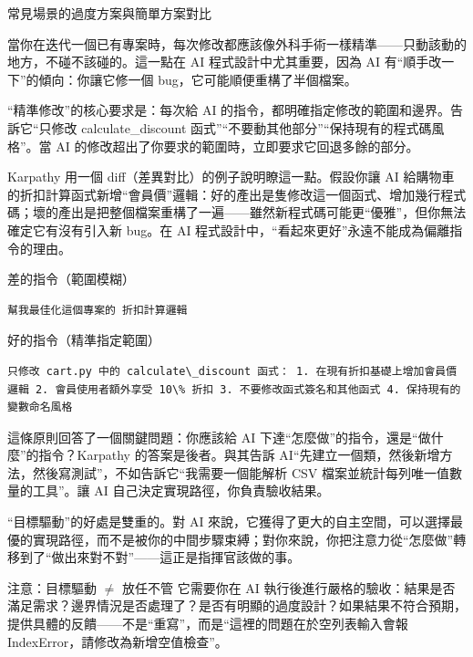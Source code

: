 \begin{center}\small\color{gray}常見場景的過度方案與簡單方案對比\end{center}


當你在迭代一個已有專案時，每次修改都應該像外科手術一樣精準——只動該動的地方，不碰不該碰的。這一點在 AI 程式設計中尤其重要，因為 AI 有“順手改一下”的傾向：你讓它修一個 bug，它可能順便重構了半個檔案。

“精準修改”的核心要求是：每次給 AI 的指令，都明確指定修改的範圍和邊界。告訴它“只修改 calculate\_discount 函式”“不要動其他部分”“保持現有的程式碼風格”。當 AI 的修改超出了你要求的範圍時，立即要求它回退多餘的部分。

Karpathy 用一個 diff（差異對比）的例子說明瞭這一點。假設你讓 AI 給購物車的折扣計算函式新增“會員價”邏輯：好的產出是隻修改這一個函式、增加幾行程式碼；壞的產出是把整個檔案重構了一遍——雖然新程式碼可能更“優雅”，但你無法確定它有沒有引入新 bug。在 AI 程式設計中，“看起來更好”永遠不能成為偏離指令的理由。

差的指令（範圍模糊）

\begin{lstlisting}
幫我最佳化這個專案的 折扣計算邏輯
\end{lstlisting}

好的指令（精準指定範圍）

\begin{lstlisting}
只修改 cart.py 中的 calculate\_discount 函式： 1. 在現有折扣基礎上增加會員價邏輯 2. 會員使用者額外享受 10\% 折扣 3. 不要修改函式簽名和其他函式 4. 保持現有的變數命名風格
\end{lstlisting}


這條原則回答了一個關鍵問題：你應該給 AI 下達“怎麼做”的指令，還是“做什麼”的指令？Karpathy 的答案是後者。與其告訴 AI“先建立一個類，然後新增方法，然後寫測試”，不如告訴它“我需要一個能解析 CSV 檔案並統計每列唯一值數量的工具”。讓 AI 自己決定實現路徑，你負責驗收結果。

“目標驅動”的好處是雙重的。對 AI 來說，它獲得了更大的自主空間，可以選擇最優的實現路徑，而不是被你的中間步驟束縛；對你來說，你把注意力從“怎麼做”轉移到了“做出來對不對”——這正是指揮官該做的事。

\begin{tcbwarn}{注意：目標驅動 $\neq$ 放任不管}
它需要你在 AI 執行後進行嚴格的驗收：結果是否滿足需求？邊界情況是否處理了？是否有明顯的過度設計？如果結果不符合預期，提供具體的反饋——不是“重寫”，而是“這裡的問題在於空列表輸入會報 IndexError，請修改為新增空值檢查”。

\end{tcbwarn}

